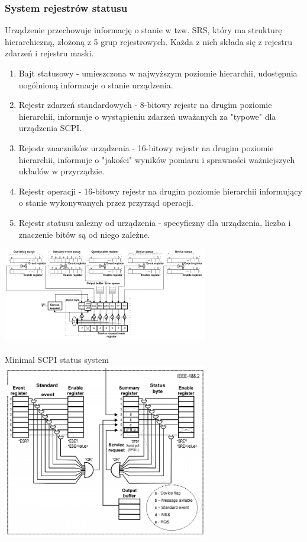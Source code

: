 \subsubsection{System rejestrów statusu}
Urządzenie przechowuje informację o stanie w tzw. SRS, który ma strukturę hierarchiczną, złożoną z 5 grup rejestrowych. Każda z nich składa się z rejestru zdarzeń i rejestru maski.
\begin{enumerate}
	\item Bajt statusowy - umieszczona w najwyższym poziomie hierarchii, udostępnia uogólnioną informacje o stanie urządzenia.
	\item Rejestr zdarzeń standardowych - 8-bitowy rejestr na drugim poziomie hierarchii, informuje o wystąpieniu zdarzeń uważanych za "typowe" dla urządzenia SCPI.
	\item Rejestr znaczników urządzenia - 16-bitowy rejestr na drugim poziomie hierarchii, informuje o "jakości" wyników pomiaru i sprawności ważniejszych układów w przyrządzie.
	\item Rejestr operacji - 16-bitowy rejestr na drugim poziomie hierarchii informujący o stanie wykonywanych przez przyrząd operacji.
	\item Rejestr statusu zależny od urządzenia - specyficzny dla urządzenia, liczba i znaczenie bitów są od niego zależne.
\end{enumerate}
\includegraphics[width=9cm]{./wyklady/IEEE488_SCPI_32_1.pdf}\\\\
Minimal SCPI status system\\
\includegraphics[width=9cm]{./wyklady/IEEE488_SCPI_33_1.pdf}
\newpage
